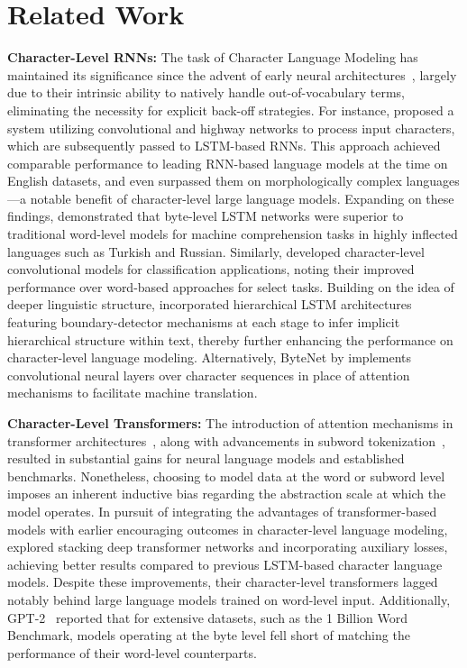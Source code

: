\section{Related Work}
\label{section:related_work}

\textbf{Character-Level RNNs:} The task of Character Language Modeling has maintained its significance since the advent of early neural architectures~\citep{sutskever2011generating,mikolov2012subword,graves2013generating}, largely due to their intrinsic ability to natively handle out-of-vocabulary terms, eliminating the necessity for explicit back-off strategies. For instance, \cite{kim2016character} proposed a system utilizing convolutional and highway networks to process input characters, which are subsequently passed to LSTM-based RNNs. This approach achieved comparable performance to leading RNN-based language models at the time on English datasets, and even surpassed them on morphologically complex languages—a notable benefit of character-level large language models. Expanding on these findings, \cite{kenter2018byte} demonstrated that byte-level LSTM networks were superior to traditional word-level models for machine comprehension tasks in highly inflected languages such as Turkish and Russian. Similarly, \cite{zhang2015character} developed character-level convolutional models for classification applications, noting their improved performance over word-based approaches for select tasks. Building on the idea of deeper linguistic structure, \citet{chung2019hierarchical} incorporated hierarchical LSTM architectures featuring boundary-detector mechanisms at each stage to infer implicit hierarchical structure within text, thereby further enhancing the performance on character-level language modeling. Alternatively, ByteNet by \cite{kalchbrenner2016neural} implements convolutional neural layers over character sequences in place of attention mechanisms to facilitate machine translation.

\textbf{Character-Level Transformers:} The introduction of attention mechanisms in transformer architectures~\citep{vaswani2017attention}, along with advancements in subword tokenization~\citep{sennrich-etal-2016-neural}, resulted in substantial gains for neural language models and established benchmarks. Nonetheless, choosing to model data at the word or subword level imposes an inherent inductive bias regarding the abstraction scale at which the model operates. In pursuit of integrating the advantages of transformer-based models with earlier encouraging outcomes in character-level language modeling, \citet{al2019character} explored stacking deep transformer networks and incorporating auxiliary losses, achieving better results compared to previous LSTM-based character language models. Despite these improvements, their character-level transformers lagged notably behind large language models trained on word-level input. Additionally, GPT-2~\citep{radfordgpt2} reported that for extensive datasets, such as the 1 Billion Word Benchmark, models operating at the byte level fell short of matching the performance of their word-level counterparts.

